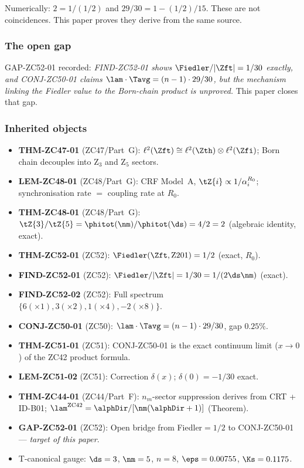 \documentclass[12pt, a4paper]{article}
\begin{document}
Numerically: $2 = 1/(1/2)$ and $29/30 = 1 - (1/2)/15$.
These are not coincidences. This paper proves they derive
from the same source.

\subsubsection{The open gap}

GAP-ZC52-01 recorded: \emph{FIND-ZC52-01 shows
$\Fiedler/|\Zft| = 1/30$ exactly, and CONJ-ZC50-01 claims
$\lam\cdot\Tavg = (n-1)\cdot 29/30$, but the mechanism
linking the Fiedler value to the Born-chain product is
unproved.} This paper closes that gap.

\subsubsection{Inherited objects}

\begin{itemize}[leftmargin=2em, noitemsep]
\item \textbf{THM-ZC47-01} (ZC47/Part~G):
  $\ell^2(\Zft)\cong\ell^2(\Zth)\otimes\ell^2(\Zfi)$;
  Born chain decouples into Z$_3$ and Z$_5$ sectors.
\item \textbf{LEM-ZC48-01} (ZC48/Part~G):
  CRF Model~A, $\tZ{i} \propto 1/\alpha_i^{R_0}$;
  synchronisation rate $=$ coupling rate at $R_0$.
\item \textbf{THM-ZC48-01} (ZC48/Part~G):
  $\tZ{3}/\tZ{5} = \phitot(\nm)/\phitot(\ds) = 4/2 = 2$
  (algebraic identity, exact).
\item \textbf{THM-ZC52-01} (ZC52):
  $\Fiedler(\Zft,\text{Z201}) = 1/2$ (exact, $R_0$).
\item \textbf{FIND-ZC52-01} (ZC52):
  $\Fiedler/|\Zft| = 1/30 = 1/(2\ds\nm)$ (exact).
\item \textbf{FIND-ZC52-02} (ZC52):
  Full spectrum $\{6(\times 1),3(\times 2),1(\times 4),-2(\times 8)\}$.
\item \textbf{CONJ-ZC50-01} (ZC50):
  $\lam\cdot\Tavg = (n-1)\cdot 29/30$, gap $0.25\%$.
\item \textbf{THM-ZC51-01} (ZC51):
  CONJ-ZC50-01 is the exact continuum limit ($x\to 0$)
  of the ZC42 product formula.
\item \textbf{LEM-ZC51-02} (ZC51):
  Correction $\delta(x)$; $\delta(0) = -1/30$ exact.
\item \textbf{THM-ZC44-01} (ZC44/Part~F):
  $n_m$-sector suppression derives from CRT + ID-B01;
  $\lam^{\rm ZC42} = \alphDir/[\nm(\alphDir+1)]$ (Theorem).
\item \textbf{GAP-ZC52-01} (ZC52): Open bridge from
  Fiedler$=1/2$ to CONJ-ZC50-01 --- \emph{target of this paper}.
\item T-canonical gauge: $\ds=3$, $\nm=5$, $n=8$,
  $\eps=0.00755$, $\Ks=0.1175$.
\end{itemize}
\end{document}
